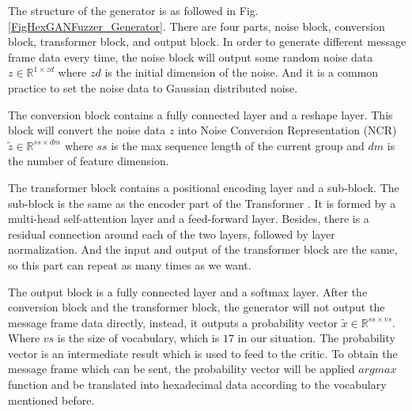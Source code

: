 The structure of the generator is as followed in Fig. \ref{FigHexGANFuzzer_Generator}. There are four parts, noise block, conversion block, transformer block, and output block. In order to generate different message frame data every time, the noise block will output some random noise data $z \in \mathbb{R}^{1 \times zd}$ where $zd$ is the initial dimension of the noise. And it is a common practice to set the noise data to Gaussian distributed noise. 

The conversion block contains a fully connected layer and a reshape layer. This block will convert the noise data $z$ into Noise Conversion Representation (NCR) $\tilde{z} \in \mathbb{R}^{ss \times dm}$ where $ss$ is the max sequence length of the current group and $dm$ is the number of feature dimension.

The transformer block contains a positional encoding layer and a sub-block. The sub-block is the same as the encoder part of the Transformer \cite{vaswani2017attention}. It is formed by a multi-head self-attention layer and a feed-forward layer. Besides, there is a residual connection around each of the two layers, followed by layer normalization. And the input and output of the transformer block are the same, so this part can repeat as many times as we want.

The output block is a fully connected layer and a softmax layer. After the conversion block and the transformer block, the generator will not output the message frame data directly, instead, it outputs a probability vector $\tilde{x} \in \mathbb{R}^{ss \times vs}$. Where $vs$ is the size of vocabulary, which is $17$ in our situation. The probability vector is an intermediate result which is used to feed to the critic. To obtain the message frame which can be sent, the probability vector will be applied $argmax$ function and be translated into hexadecimal data according to the vocabulary mentioned before.

